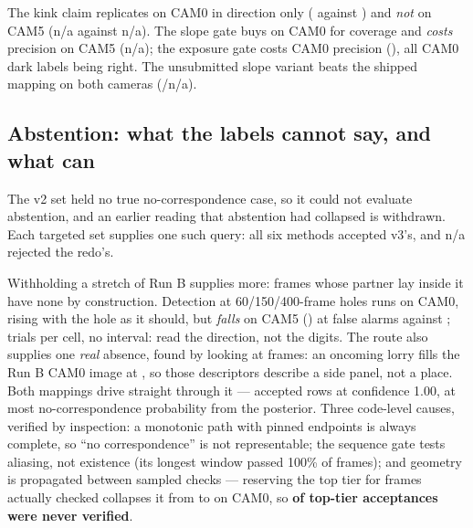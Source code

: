 \documentclass[10pt,a4paper]{article}
\providecommand{\VthreebKinkMissCamFive}{n/a}
\providecommand{\VthreebCorridorMissCamFive}{n/a}
\providecommand{\VthreebSlopeGateCamFive}{n/a}
\providecommand{\VthreebVariantCamFive}{n/a}
\providecommand{\VthreebNoCorrespondenceRejectingMethods}{n/a}
\begin{document}
The kink claim replicates on CAM0 in direction only (\VthreeKinkMissCamZero{}
against \VthreeCorridorMissCamZero{}) and \emph{not} on CAM5
(\VthreebKinkMissCamFive{} against \VthreebCorridorMissCamFive{}). The slope
gate buys \VthreeSlopeGateCamZero{} on CAM0 for coverage
\VthreeSlopeGateCamZeroCoverage{} and \emph{costs} precision on CAM5
(\VthreebSlopeGateCamFive{}); the exposure gate costs CAM0 precision
(\VthreeDarkGateCamZero{}), all \VthreeDarkCamZeroCount{} CAM0 dark labels being
right. The unsubmitted slope variant beats the shipped mapping on both cameras
(\VthreeVariantCamZero{}/\VthreebVariantCamFive{}).

\subsection{Abstention: what the labels cannot say, and what can}

The v2 set held no true no-correspondence case, so it could not evaluate
abstention, and an earlier reading that abstention had collapsed is withdrawn.
Each targeted set supplies one such query: all six methods accepted v3's, and
\VthreebNoCorrespondenceRejectingMethods{} rejected the redo's.

Withholding a stretch of Run B supplies more: frames whose partner lay inside it
have none by construction. Detection at 60/150/400-frame holes runs
\AbstentionCamZeroByWidth{} on CAM0, rising with the hole as it should, but
\emph{falls} on CAM5 (\AbstentionCamFiveByWidth{}) at
\AbstentionFalseAlarmCamFive{} false alarms against \AbstentionFalseAlarm{};
\AbstentionTrials{} trials per cell, no interval: read the direction, not the digits. The route also supplies one
\emph{real} absence, found by looking at frames: an oncoming lorry fills the
Run B CAM0 image at \OcclusionInterval{}, so those descriptors describe a side
panel, not a place. Both mappings drive straight through it --- \OcclusionRows{}
accepted rows at confidence 1.00, at most \OcclusionNullMax{} no-correspondence
probability from the posterior. Three code-level causes, verified by
inspection: a monotonic path with pinned endpoints is always complete, so ``no
correspondence'' is not representable; the sequence gate tests aliasing, not
existence (its longest window passed 100\% of frames); and geometry is
propagated between sampled checks --- reserving the top tier for frames actually
checked collapses it from \StrictGeometryBefore{} to \StrictGeometryAfter{} on
CAM0, so \textbf{\StrictGeometryUnverified{} of top-tier acceptances were never
verified}.
\end{document}
